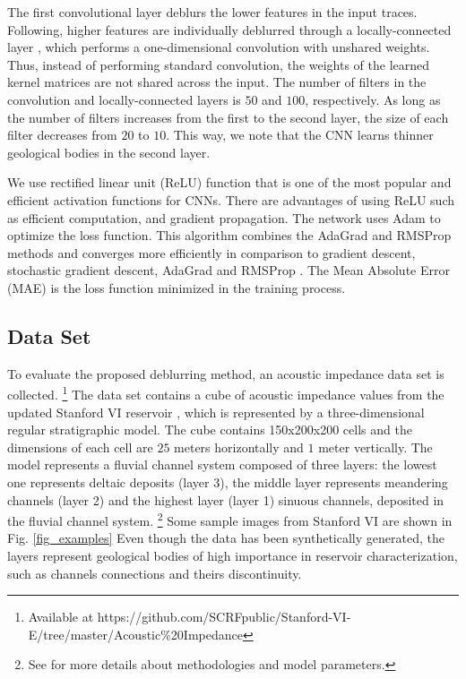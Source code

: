 \documentclass[journal]{IEEEtran}
\begin{document}
The first convolutional layer deblurs the lower features in
the input traces. Following, higher features are individually
deblurred through a locally-connected layer \cite{},
which performs a one-dimensional convolution
with unshared weights. Thus, instead of performing standard
convolution, the weights of the learned kernel matrices are not
shared across the input. The number of filters in the convolution
and locally-connected layers is $50$ and $100$, respectively.
As long as the number of filters increases from the first to the
second layer, the size of each filter decreases from $20$ to $10$.
This way, we note that the CNN learns thinner geological
bodies in the second layer.

We use rectified linear unit (ReLU) function that is one
of the most popular and efficient activation functions for
CNNs. There are advantages of using ReLU such as efficient
computation, and gradient propagation. The network uses
Adam to optimize the loss function. This algorithm
combines the AdaGrad and RMSProp methods and converges more efficiently in
comparison to gradient descent, stochastic gradient descent, AdaGrad
and RMSProp \cite{Kingma2014}. The Mean Absolute Error (MAE) is the
loss function minimized in the training process.

\subsection{Data Set}
To evaluate the proposed deblurring method, an acoustic
impedance data set is collected. \footnote{Available at https://github.com/SCRFpublic/Stanford-VI-E/tree/master/Acoustic\%20Impedance} %
The data set contains a cube of acoustic impedance values
from the updated Stanford VI reservoir \cite{Lee2012}, which
is represented by a three-dimensional regular stratigraphic
model. The cube contains 150x200x200 cells and the dimensions
of each cell are $25$ meters horizontally and $1$ meter vertically.
The model represents a fluvial channel system composed of three
layers: the lowest one represents deltaic deposits (layer 3), the
middle layer represents meandering channels (layer 2) and the highest
layer (layer 1) sinuous channels, deposited in the fluvial channel system.
\footnote{See \cite{Castro2005} for more details about methodologies and model parameters.}
Some sample images from Stanford VI are shown in Fig. \ref{fig_examples}
Even though the data has been synthetically generated,
the layers represent geological bodies of high importance
in reservoir characterization, such as channels connections and theirs
discontinuity. 
\end{document}
